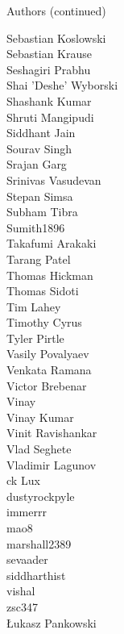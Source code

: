 \begin{frame}{Authors (continued)}
\begin{multicols}{5}
Sebastian Koslowski\\
Sebastian Krause\\
Seshagiri Prabhu\\
Shai 'Deshe' Wyborski\\
Shashank Kumar\\
Shruti Mangipudi\\
Siddhant Jain\\
Sourav Singh\\
Srajan Garg\\
Srinivas Vasudevan\\
Stepan Simsa\\
Subham Tibra\\
Sumith1896\\
Takafumi Arakaki\\
Tarang Patel\\
Thomas Hickman\\
Thomas Sidoti\\
Tim Lahey\\
Timothy Cyrus\\
Tyler Pirtle\\
Vasily Povalyaev\\
Venkata Ramana\\
Victor Brebenar\\
Vinay\\
Vinay Kumar\\
Vinit Ravishankar\\
Vlad Seghete\\
Vladimir Lagunov\\
ck Lux\\
dustyrockpyle\\
immerrr\\
mao8\\
marshall2389\\
sevaader\\
siddharthist\\
vishal\\
zsc347\\
Łukasz Pankowski\\
\end{multicols}
\end{frame}
